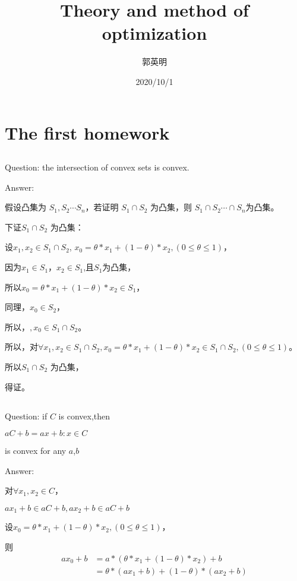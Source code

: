 \documentclass[UTF8]{ctexart}
\title{Theory and method of optimization}
\author{郭英明}
\date{2020/10/1}
\begin{document}
\maketitle
\tableofcontents

\newpage

\section{The first homework}
\subsection{}
Question: 
the intersection of convex sets is convex.

Answer:

假设凸集为 $S_1,S_2 \cdots S_{n}$，若证明 $S_1\cap S_2$ 为凸集，则 $S_1\cap S_2 \cdots \cap S_{n}$为凸集。

下证$S_1\cap S_2$ 为凸集：

设$x_1,x_2\in S_1\cap S_2$, $x_0 = \theta * x_1 + (1 - \theta ) * x_2, (0 \leq \theta \leq 1)$，

因为$x_1 \in S_1$，$x_2 \in S_1$,且$S_1$为凸集，

所以$x_0 = \theta * x_1 + (1 - \theta ) * x_2 \in S_1$，

同理，$x_0 \in S_2$，

所以，$,x_0\in S_1\cap S_2$。

所以，对$\forall x_1,x_2 \in S_1 \cap S_2,x_0 = \theta * x_1 + (1 - \theta ) * x_2 \in S_1 \cap S_2, (0 \leq \theta \leq 1)$。

所以$S_1\cap S_2$ 为凸集，

得证。

\subsection{}
Question: 
if $C$ is convex,then
\begin{center}
$aC + b = {ax + b:x \in C}$
\end{center}
is convex for any $a$,$b$

Answer:

对$\forall x_1,x_2 \in C$，

$ax_1 + b \in aC + b,ax_2 + b \in aC + b$

设$x_0 = \theta * x_1 + (1 - \theta ) * x_2, (0 \leq \theta \leq 1)$，

则\begin{align}\nonumber
ax_0 + b &= a*(\theta * x_1 + (1 - \theta ) * x_2) + b \\
\nonumber &= \theta * (ax_1 + b) + (1 - \theta) * (ax_2 + b)
\end{align}
\end{document}
